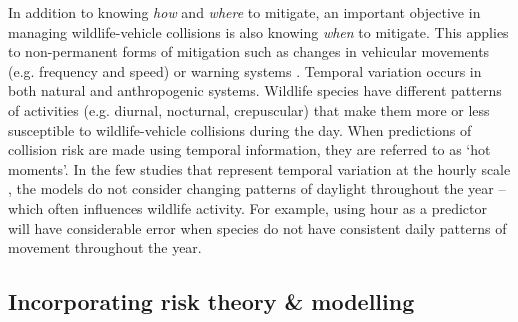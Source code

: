 In addition to knowing \textit{how} and \textit{where} to mitigate, an important objective in managing wildlife-vehicle collisions is also knowing \textit{when} to mitigate. This applies to non-permanent forms of mitigation such as changes in vehicular movements (e.g. frequency and speed) or warning systems \citep[but see][for review of automated signs]{huij03}. Temporal variation occurs in both natural and anthropogenic systems. Wildlife species have different patterns of activities (e.g. diurnal, nocturnal, crepuscular) that make them more or less susceptible to wildlife-vehicle collisions during the day. When predictions of collision risk are made using temporal information, they are referred to as `hot moments'. In the few studies that represent temporal variation at the hourly scale \citep[e.g.][]{neum12}, the models do not consider changing patterns of daylight throughout the year -- which often influences wildlife activity. For example, using hour as a predictor will have considerable error when species do not have consistent daily patterns of movement throughout the year. 



\subsection{Incorporating risk theory \& modelling}

